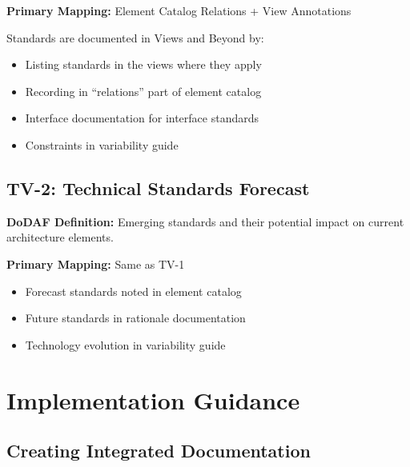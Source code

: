 \documentclass[11pt]{article}
\begin{document}
\begin{vbbox}
\textbf{Primary Mapping:} Element Catalog Relations + View Annotations

Standards are documented in Views and Beyond by:
\begin{itemize}
    \item Listing standards in the views where they apply
    \item Recording in ``relations'' part of element catalog
    \item Interface documentation for interface standards
    \item Constraints in variability guide
\end{itemize}
\end{vbbox}

\subsection{TV-2: Technical Standards Forecast}

\begin{dodafbox}
\textbf{DoDAF Definition:} Emerging standards and their potential impact on current architecture elements.
\end{dodafbox}

\begin{vbbox}
\textbf{Primary Mapping:} Same as TV-1

\begin{itemize}
    \item Forecast standards noted in element catalog
    \item Future standards in rationale documentation
    \item Technology evolution in variability guide
\end{itemize}
\end{vbbox}

\section{Implementation Guidance}

\subsection{Creating Integrated Documentation}
\end{document}
